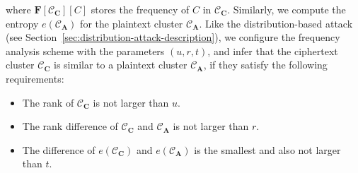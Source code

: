 where $\mathbf{F}[\mathcal{C}_\mathbf{C}][C]$  stores the frequency of $C$ in $\mathcal{C}_\mathbf{C}$. Similarly, we  compute the entropy $e(\mathcal{C}_\mathbf{A})$ for the plaintext cluster $\mathcal{C}_\mathbf{A}$. Like the distribution-based attack (see Section~\ref{sec:distribution-attack-description}), we configure the frequency analysis scheme with the parameters $(u, r, t)$, and infer that the ciphertext cluster $\mathcal{C}_\mathbf{C}$ is similar to a plaintext cluster $\mathcal{C}_\mathbf{A}$, if they satisfy the following requirements:
  
\begin{itemize}[leftmargin=*]
    \item  The rank of $\mathcal{C}_\mathbf{C}$ is not larger than $u$.
    \item  The rank difference of $\mathcal{C}_\mathbf{C}$ and $\mathcal{C}_\mathbf{A}$ is not larger than $r$.  
    \item  The difference of $e(\mathcal{C}_\mathbf{C})$ and $e(\mathcal{C}_\mathbf{A})$ is the smallest and also not larger than $t$.
\end{itemize}

